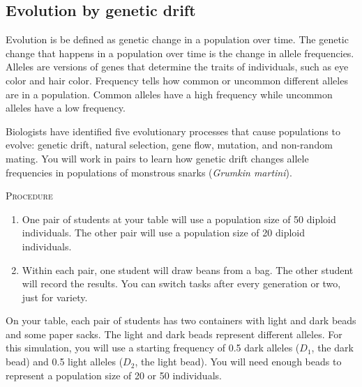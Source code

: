 \documentclass[12pt]{exam}
\begin{document}
\subsection*{Evolution by genetic drift}

Evolution is be defined as genetic change in a population over time. 
The genetic change that happens in a population over time is the change 
in allele frequencies. Alleles are versions of genes that determine the 
traits of individuals, such as eye color and hair color. Frequency tells 
how common or uncommon different alleles are in a population. Common 
alleles have a high frequency while uncommon alleles have a low frequency.  

Biologists have identified five evolutionary processes that cause 
populations to evolve: genetic drift, natural selection, gene flow, 
mutation, and non-random mating. You will work in pairs to learn how 
genetic drift changes allele frequencies in populations of monstrous snarks
(\textit{Grumkin martini}). 

\bigskip

\textsc{Procedure}

\medskip

\begin{enumerate}
	\item One pair of students at your table will use a population size of 
	50 diploid individuals. The other pair will use a population size of 20
	diploid individuals. 
	
	\item Within each pair, one student will draw beans from a bag. The other
	student will record the results. You can switch tasks after every 
	generation or two, just for variety.
	
\end{enumerate}

On your table, each pair of students has two containers with light and dark beads and some 
paper sacks. The light and dark beads represent different alleles. For this 
simulation, you will use a starting frequency of 0.5 dark alleles ($D_1$, the dark 
bead) and 0.5 light alleles ($D_2$, the light bead). You will need enough beads 
to represent a population size of 20 or 50 individuals.
\end{document}
